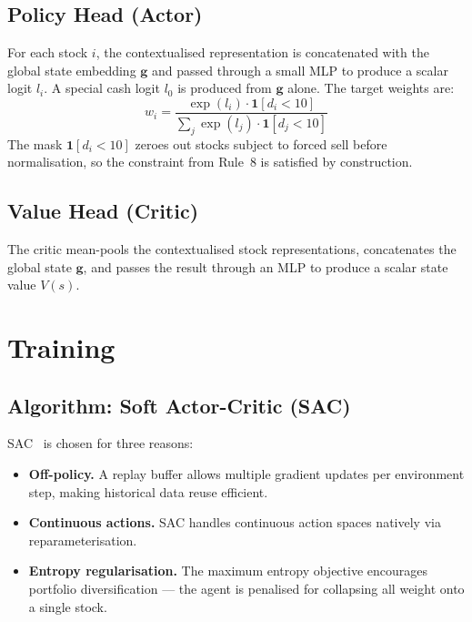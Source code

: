 \documentclass[11pt, a4paper]{article}
\begin{document}
\subsection{Policy Head (Actor)}

For each stock $i$, the contextualised representation is concatenated with the
global state embedding $\mathbf{g}$ and passed through a small MLP to produce
a scalar logit $l_i$. A special cash logit $l_0$ is produced from $\mathbf{g}$
alone. The target weights are:
\[
    w_i = \frac{\exp(l_i) \cdot \mathbf{1}[d_i < 10]}
               {\sum_j \exp(l_j) \cdot \mathbf{1}[d_j < 10]}
\]
The mask $\mathbf{1}[d_i < 10]$ zeroes out stocks subject to forced sell
before normalisation, so the constraint from Rule~8 is satisfied by
construction.

\subsection{Value Head (Critic)}

The critic mean-pools the contextualised stock representations, concatenates
the global state $\mathbf{g}$, and passes the result through an MLP to
produce a scalar state value $V(s)$.

\section{Training}

\subsection{Algorithm: Soft Actor-Critic (SAC)}

SAC~\cite{haarnoja2018sac, haarnoja2018sacapps} is chosen for three reasons:
\begin{itemize}
    \item \textbf{Off-policy.} A replay buffer allows multiple gradient updates
          per environment step, making historical data reuse efficient.
    \item \textbf{Continuous actions.} SAC handles continuous action spaces
          natively via reparameterisation.
    \item \textbf{Entropy regularisation.} The maximum entropy objective
          encourages portfolio diversification — the agent is penalised for
          collapsing all weight onto a single stock.
\end{itemize}
\end{document}
